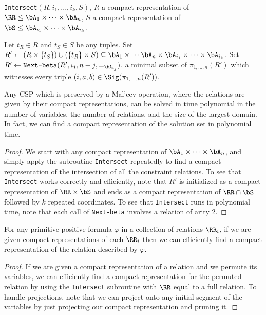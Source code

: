 \begin{algorithm}
\caption{\texttt{Intersect}$(R, i_1, ..., i_k, S)$, $R$ a compact representation of $\RR \le \bA_1\times \cdots\times \bA_n$, $S$ a compact representation of $\bS \le \bA_{i_1} \times \cdots \times \bA_{i_k}$.}
\begin{algorithmic}[1]
\State Let $t_R \in R$ and $t_S \in S$ be any tuples.
\State Set $R' \gets (R \times \{t_S\}) \cup (\{t_R\}\times S) \subseteq \bA_1 \times \cdots \bA_n \times \bA_{i_1} \times \cdots \times \bA_{i_k}$.
\State Set $R' \gets \texttt{Next-beta}(R', i_j, n+j, =_{\bA_{i_j}})$.
\EndFor
\State \Return a minimal subset of $\pi_{1, ..., n}(R')$ which witnesses every triple $(i,a,b) \in \Sig(\pi_{1, ..., n}(R'))$.
\end{algorithmic}
\end{algorithm}

\begin{thm} Any CSP which is preserved by a Mal'cev operation, where the relations are given by their compact representations, can be solved in time polynomial in the number of variables, the number of relations, and the size of the largest domain. In fact, we can find a compact representation of the solution set in polynomial time.
\end{thm}
\begin{proof} We start with any compact representation of $\bA_1 \times \cdots \times \bA_n$, and simply apply the subroutine \texttt{Intersect} repeatedly to find a compact representation of the intersection of all the constraint relations. To see that \texttt{Intersect} works correctly and efficiently, note that $R'$ is initialized as a compact representation of $\RR \times \bS$ and ends as a compact representation of $\RR\cap \bS$ followed by $k$ repeated coordinates. To see that \texttt{Intersect} runs in polynomial time, note that each call of \texttt{Next-beta} involves a relation of arity $2$.
\end{proof}

\begin{cor} For any primitive positive formula $\varphi$ in a collection of relations $\RR_i$, if we are given compact representations of each $\RR_i$ then we can efficiently find a compact representation of the relation described by $\varphi$.
\end{cor}
\begin{proof} If we are given a compact representation of a relation and we permute its variables, we can efficiently find a compact representation for the permuted relation by using the \texttt{Intersect} subroutine with $\RR$ equal to a full relation. To handle projections, note that we can project onto any initial segment of the variables by just projecting our compact representation and pruning it.
\end{proof}

